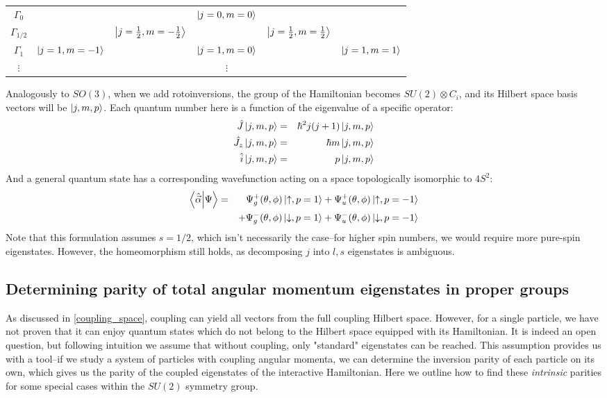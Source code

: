 \documentclass[12pt]{article}
\begin{document}
	\begin{center}
	\begin{tabular}{c|c c c c c}
	$\Gamma_0$ & & & $\ket{j=0, m=0}$ & &\\
	$\Gamma_{1/2}$ & & $\ket{j=\frac{1}{2},m=-\frac{1}{2}}$ & & $\ket{j=\frac{1}{2},m=\frac{1}{2}}$ &\\
	$\Gamma_1$ & $\ket{j=1,m=-1}$ & & $\ket{j=1,m=0}$ & & $\ket{j=1,m=1}$\\
	$\vdots$ & & & $\vdots$ & &
	\end{tabular}
	\end{center}
	
	Analogously to $SO(3)$, when we add rotoinversions, the group of the Hamiltonian becomes $SU(2)\otimes C_i$, and its Hilbert space basis vectors will be $\ket{j,m,p}$. Each quantum number here is a function of the eigenvalue of a specific operator:
	\begin{eqnarray*}
	\hat{J}\ket{j,m,p}&=&\hbar^2 j(j+1)\ket{j,m,p}\\
	\hat{J_z}\ket{j,m,p}&=&\hbar m\ket{j,m,p}\\
	\hat{i}\ket{j,m,p}&=&p\ket{j,m,p}
	\end{eqnarray*}
	And a general quantum state has a corresponding wavefunction acting on a space topologically isomorphic to $4S^2$:
	\begin{eqnarray*}		
	\braket{\hat{\vec{\alpha}}}{\Psi}&=&\Psi_g^+(\theta,\phi)\ket{\uparrow,p=1}+\Psi_u^+(\theta,\phi)\ket{\uparrow,p=-1}\\
	&&+\Psi_g^-(\theta,\phi)\ket{\downarrow,p=1}+\Psi_u^-(\theta,\phi)\ket{\downarrow,p=-1}
	\end{eqnarray*}
	Note that this formulation assumes $s=1/2$, which isn't necessarily the case--for higher spin numbers, we would require more pure-spin eigenstates. However, the homeomorphism still holds, as decomposing $j$ into $l,s$ eigenstates is ambiguous.
	
	\subsection{Determining parity of total angular momentum eigenstates in proper groups}
	
	As discussed in \ref{coupling_space}, coupling can yield all vectors from the full coupling Hilbert space. However, for a single particle, we have not proven that it can enjoy quantum states which do not belong to the Hilbert space equipped with its Hamiltonian. It is indeed an open question, but following intuition we assume that without coupling, only "standard" eigenstates can be reached. This assumption provides us with a tool--if we study a system of particles with coupling angular momenta, we can determine the inversion parity of each particle on its own, which gives us the parity of the coupled eigenstates of the interactive Hamiltonian. Here we outline how to find these \textit{intrinsic} parities for some special cases within the $SU(2)$ symmetry group.
	
\end{document}
